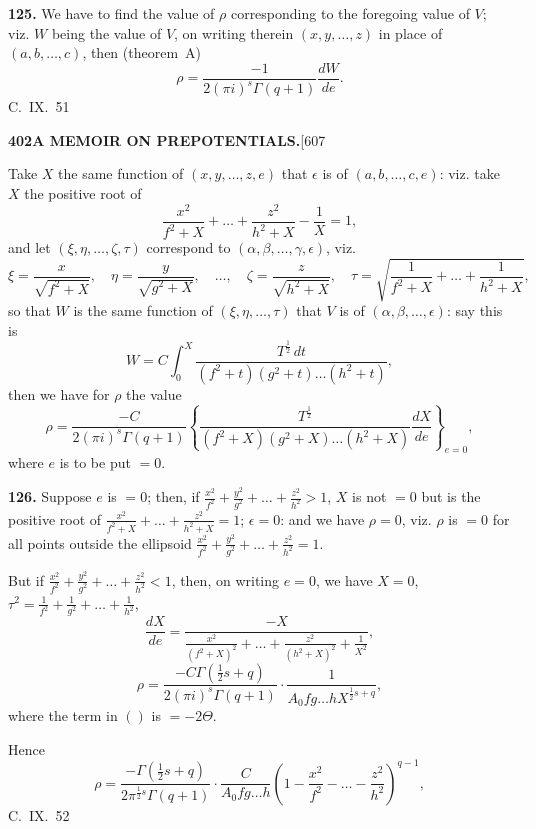 \documentclass[11pt,a4paper]{article}
\begin{document}
{\medskip
\noindent\textbf{125.}
We have to find the value of $\rho$ corresponding to the foregoing value of $V$; viz. $W$ being the value of $V$, on writing therein $(x, y, \ldots, z)$ in place of $(a, b, \ldots, c)$, then (theorem~A)
\[
\rho = \frac{-1}{2(\pi i)^s \Gamma(q+1)} \frac{dW}{de}.
\]
\hfill C.~IX.\ 51

\newpage
\noindent\textbf{402}\hspace{\fill}\textbf{A MEMOIR ON PREPOTENTIALS.}\hspace{\fill}[607

Take $X$ the same function of $(x, y, \ldots, z, e)$ that $\epsilon$ is of $(a, b, \ldots, c, e)$: viz. take $X$ the positive root of
\[
\frac{x^2}{f^2+X} + \ldots + \frac{z^2}{h^2+X} - \frac{1}{X} = 1,
\]
and let $(\xi, \eta, \ldots, \zeta, \tau)$ correspond to $(\alpha, \beta, \ldots, \gamma, \epsilon)$, viz.
\[
\xi = \frac{x}{\sqrt{f^2+X}},\quad \eta = \frac{y}{\sqrt{g^2+X}},\quad \ldots,\quad \zeta = \frac{z}{\sqrt{h^2+X}},\quad \tau = \sqrt{\frac{1}{f^2+X} + \ldots + \frac{1}{h^2+X}},
\]
so that $W$ is the same function of $(\xi, \eta, \ldots, \tau)$ that $V$ is of $(\alpha, \beta, \ldots, \epsilon)$: say this is
\[
W = C\int_0^X \frac{T^{\frac{1}{2}}\,dt}{(f^2+t)(g^2+t)\ldots(h^2+t)},
\]
then we have for $\rho$ the value
\[
\rho = \frac{-C}{2(\pi i)^s \Gamma(q+1)} \left\{ \frac{T^{\frac{1}{2}}}{(f^2+X)(g^2+X)\ldots(h^2+X)} \frac{dX}{de} \right\}_{e=0},
\]
where $e$ is to be put $=0$.

\medskip
\noindent\textbf{126.}
Suppose $e$ is $=0$; then, if $\frac{x^2}{f^2} + \frac{y^2}{g^2} + \ldots + \frac{z^2}{h^2} > 1$, $X$ is not $=0$ but is the positive root of $\frac{x^2}{f^2+X} + \ldots + \frac{z^2}{h^2+X} = 1$; $\epsilon = 0$: and we have $\rho = 0$, viz. $\rho$ is $=0$ for all points outside the ellipsoid $\frac{x^2}{f^2} + \frac{y^2}{g^2} + \ldots + \frac{z^2}{h^2} = 1$.

But if $\frac{x^2}{f^2} + \frac{y^2}{g^2} + \ldots + \frac{z^2}{h^2} < 1$, then, on writing $e = 0$, we have $X = 0$, $\tau^2 = \frac{1}{f^2} + \frac{1}{g^2} + \ldots + \frac{1}{h^2}$,
\[
\frac{dX}{de} = \frac{-X}{\frac{x^2}{(f^2+X)^2} + \ldots + \frac{z^2}{(h^2+X)^2} + \frac{1}{X^2}},
\]
\[
\rho = \frac{-C\Gamma(\tfrac{1}{2}s+q)}{2(\pi i)^s \Gamma(q+1)} \cdot \frac{1}{A_0 f g \ldots h X^{\frac{1}{2}s+q}},
\]
where the term in $()$ is $= -2\Theta$.

Hence
\[
\rho = \frac{-\Gamma(\tfrac{1}{2}s+q)}{2\pi^{\frac{1}{2}s} \Gamma(q+1)} \cdot \frac{C}{A_0 f g \ldots h} \left(1 - \frac{x^2}{f^2} - \ldots - \frac{z^2}{h^2}\right)^{q-1},
\]
\hfill C.~IX.\ 52

}
\end{document}
